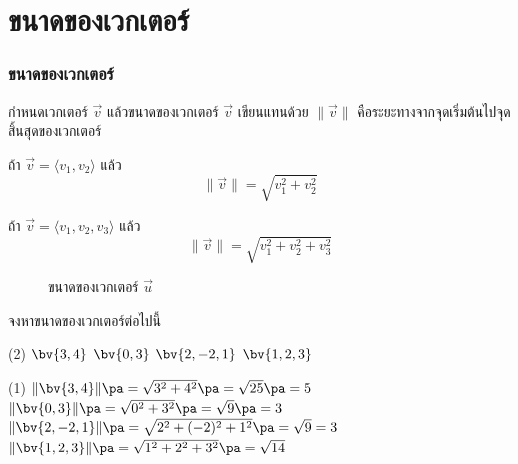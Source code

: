 \section{ขนาดของเวกเตอร์}
\frame{\sectionpage}

\begin{frame}
\frametitle{ขนาดของเวกเตอร์}
\begin{defn}{}{}
กำหนดเวกเตอร์ $\vec{v}$ แล้ว\alert{ขนาดของเวกเตอร์  $\vec{v}$} เขียนแทนด้วย $\| \vec{v} \|$ คือระยะทางจากจุดเริ่มต้นไปจุดสิ้นสุดของเวกเตอร์ \pa

ถ้า $\vec{v} = \langle v_1, v_2 \rangle $ แล้ว 
\begin{equation}
\| \vec{v} \| = \sqrt{v_1^2 + v_2^2}
\end{equation} \pa

ถ้า $\vec{v} = \langle v_1, v_2, v_3\rangle$ แล้ว 
\begin{equation}
\| \vec{v} \| = \sqrt{v_1^2 + v_2^2 + v_3^2}
\end{equation} \pa
\end{defn}
\end{frame}

\begin{frame}
\begin{figure}[h!]
\centering
{}
\caption{ขนาดของเวกเตอร์ $\vec{u}$}
\end{figure}
\end{frame}



\begin{frame}[t]
\begin{ex}{}
จงหาขนาดของเวกเตอร์ต่อไปนี้
\begin{tasks}(2)
\task $\bv{3,4}$
\task $\bv{0,3}$
\task $\bv{2,-2,1}$
\task $\bv{1,2,3}$
\end{tasks}
\end{ex}
\begin{sol}
\begin{tasks}(1)
\task $\| \bv{3,4} \| \pa = \sqrt{3^2+4^2} \pa = \sqrt{25} \pa = 5$ \pa
\task $\| \bv{0,3} \| \pa = \sqrt{0^2 + 3^2} \pa = \sqrt{9}\pa = 3$ \pa
\task $\| \bv{2,-2,1} \| \pa = \sqrt{2^2 + (-2)^2 + 1^2} \pa = \sqrt{9} = 3$ \pa
\task $\| \bv{1,2,3} \| \pa = \sqrt{1^2 + 2^2 + 3^2} \pa = \sqrt{14}$
\end{tasks}
\end{sol}
\end{frame}

